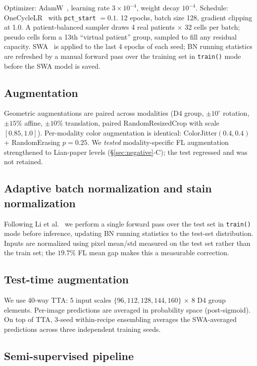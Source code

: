 \documentclass[conference]{IEEEtran}
\begin{document}
Optimizer: AdamW~\cite{loshchilov2017adamw}, learning rate $3 \times 10^{-4}$, weight decay $10^{-4}$. Schedule: OneCycleLR~\cite{smith2018onecycle} with \texttt{pct\_start} $=0.1$. 12 epochs, batch size 128, gradient clipping at 1.0. A patient-balanced sampler draws 4 real patients $\times$ 32 cells per batch; pseudo cells form a 13th ``virtual patient'' group, sampled to fill any residual capacity. SWA~\cite{izmailov2018swa} is applied to the last 4 epochs of each seed; BN running statistics are refreshed by a manual forward pass over the training set in \texttt{train()} mode before the SWA model is saved.

\subsection{Augmentation}

Geometric augmentations are paired across modalities (D4 group, $\pm 10^{\circ}$ rotation, $\pm 15\%$ affine, $\pm 10\%$ translation, paired RandomResizedCrop with scale $[0.85, 1.0]$). Per-modality color augmentation is identical: ColorJitter$(0.4, 0.4)$ + RandomErasing $p = 0.25$. We \emph{tested} modality-specific FL augmentation strengthened to Lian-paper levels (\S\ref{sec:negative}-C); the test regressed and was not retained.

\subsection{Adaptive batch normalization and stain normalization}

Following Li et al.~\cite{li2016adabn} we perform a single forward pass over the test set in \texttt{train()} mode before inference, updating BN running statistics to the test-set distribution. Inputs are normalized using pixel mean/std measured on the test set rather than the train set; the $19.7\%$ FL mean gap makes this a measurable correction.

\subsection{Test-time augmentation}

We use 40-way TTA: 5 input scales $\{96, 112, 128, 144, 160\}$ $\times$ 8 D4 group elements. Per-image predictions are averaged in probability space (post-sigmoid). On top of TTA, 3-seed within-recipe ensembling averages the SWA-averaged predictions across three independent training seeds.

\subsection{Semi-supervised pipeline}
\end{document}
